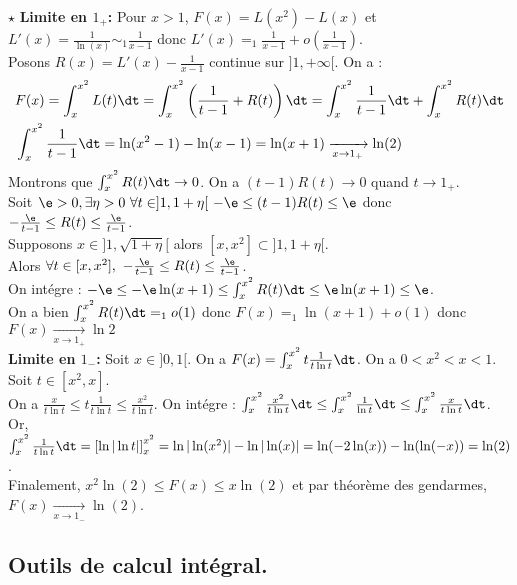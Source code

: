 \documentclass[11pt]{article}
\begin{document}
\begin{ex}{$\star$}{}
    \textbf{Limite en $1_+$:} Pour $x>1$, $F(x)=L(x^2)-L(x)$ et $L'(x)=\frac{1}{\ln(x)}\sim_1\frac{1}{x-1}$ donc $L'(x)=_1\frac{1}{x-1}+o(\frac{1}{x-1})$.\\
    Posons $R(x)=L'(x)-\frac{1}{x-1}$ continue sur $]1,+\infty[$. On a :
    \begin{align*}
        &F(x)=\int_x^{x^2}L(t)\dt=\int_x^{x^2}\left(\frac{1}{t-1}+R(t)\right)\dt=\int_x^{x^2}\frac{1}{t-1}\dt+\int_x^{x^2}R(t)\dt\\
        &\int_x^{x^2}\frac{1}{t-1}\dt=\ln(x^2-1)-\ln(x-1)=\ln(x+1)\xrightarrow[x\to1_+]{}\ln(2)
    \end{align*}
    Montrons que $\int_x^{x^2}R(t)\dt\to0$. On a $(t-1)R(t)\to0$ quand $t\to1_+$.\\
    Soit $\e>0, \exists\eta>0~\forall t\in]1,1+\eta[ ~ -\e\leq(t-1)R(t)\leq\e$ donc $-\frac{\e}{t-1}\leq R(t) \leq \frac{\e}{t-1}$.\\
    Supposons $x\in]1,\sqrt{1+\eta}[$ alors $[x,x^2]\subset]1,1+\eta[$.\\
    Alors $\forall t \in [x,x^2], ~ -\frac{\e}{t-1}\leq R(t) \leq \frac{\e}{t-1}$.\\
    On intégre : $-\e\leq-\e\ln(x+1) \leq \int_x^{x^2}R(t)\dt\leq \e\ln(x+1)\leq\e$.\\
    On a bien $\int_x^{x^2}R(t)\dt=_1o(1)$ donc $F(x)=_1\ln(x+1)+o(1)$ donc $F(x)\xrightarrow[x\to1_+]{}\ln2$\\
    \textbf{Limite en $1_-$:} Soit $x\in]0,1[$. On a $F(x)=\int_x^{x^2}t\frac{1}{t\ln t}\dt$. On a $0<x^2<x<1$. Soit $t\in[x^2,x]$.\\
    On a $\frac{x}{t\ln t}\leq t\frac{1}{t\ln t}\leq \frac{x^2}{t\ln t}$. On intégre : $\int_x^{x^2}\frac{x^2}{t\ln t}\dt\leq\int_x^{x^2}\frac{1}{\ln t}\dt \leq \int_x^{x^2}\frac{x}{t\ln t}\dt$.\\
    Or, $\int_x^{x^2}\frac{1}{t\ln t}\dt = \left[ \ln | \ln t | \right]_x^{x^2}=\ln|\ln(x^2)|-\ln|\ln(x)|=\ln(-2\ln(x))-\ln(\ln(-x))=\ln(2)$.\\
    Finalement, $x^2\ln(2)\leq F(x) \leq x\ln(2)$ et par théorème des gendarmes, $F(x)\xrightarrow[x\to1_-]{}\ln(2)$.
\end{ex}

\subsection{Outils de calcul intégral.}
\end{document}
